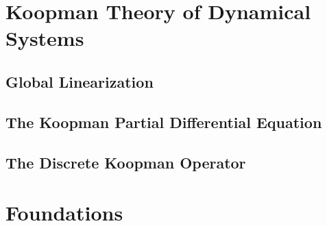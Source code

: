 \chapter{Koopman Theory of Dynamical Systems}
	\label{c:koopmanTheoryOfDynamicalSystems}


	\section{Global Linearization}


	\section{The Koopman Partial Differential Equation}  %

	\section{The Discrete Koopman Operator}



\chapter{Foundations}
	\label{c:foundations}

